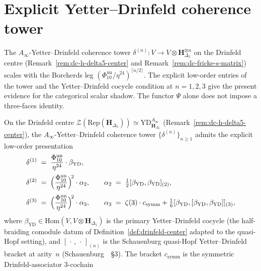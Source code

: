 \section{Explicit Yetter--Drinfeld coherence tower}
\label{sec:dc-yd-tower}

The $A_\infty$-Yetter--Drinfeld coherence tower
$\delta^{(n)}\colon V \to V\otimes \mathbf{H}_{\Delta_5}^{\otimes n}$
on the Drinfeld centre (Remark~\ref{rem:dc-h-delta5-center}
and Remark~\ref{rem:dc-fricke-s-matrix}) scales with the
Borcherds leg $(\Phi_{10}^{\mathrm{un}}/\eta^{24})^{\lceil n/2\rceil}$. The explicit
low-order entries of the tower and the Yetter--Drinfeld cocycle
condition at \(n=1,2,3\) give the present evidence for the categorical
scalar shadow. The functor \(\Psi\) alone does not impose a
three-faces identity.

\begin{proposition}
\label{prop:dc-yd-tower}
On the Drinfeld centre
$\mathcal{Z}(\mathrm{Rep}(\mathbf{H}_{\Delta_5})) \simeq
\mathrm{YD}^{A_\infty}_{\mathbf{H}_{\Delta_5}}$
(Remark~\ref{rem:dc-h-delta5-center}), the
$A_\infty$-Yetter--Drinfeld coherence tower
$\{\delta^{(n)}\}_{n\geq 1}$ admits the explicit low-order
presentation
\begin{align}
 \delta^{(1)} &\;=\; \frac{\Phi_{10}^{\mathrm{un}}}{\eta^{24}}\cdot\beta_{\mathrm{YD}},
 \label{eq:dc-delta-1}\\[2pt]
 \delta^{(2)} &\;=\; \Bigl(\frac{\Phi_{10}^{\mathrm{un}}}{\eta^{24}}\Bigr)^{\!2}
 \cdot \alpha_2,
 \qquad
 \alpha_2 \;=\; \tfrac{1}{2}[\beta_{\mathrm{YD}}, \beta_{\mathrm{YD}}]_{(2)},
 \label{eq:dc-delta-2}\\[2pt]
 \delta^{(3)} &\;=\; \Bigl(\frac{\Phi_{10}^{\mathrm{un}}}{\eta^{24}}\Bigr)^{\!2}
 \cdot \alpha_3,
 \qquad
 \alpha_3 \;=\; \zeta(3)\cdot c_{\mathrm{symm}}
 + \tfrac{1}{6}[\beta_{\mathrm{YD}},[\beta_{\mathrm{YD}},\beta_{\mathrm{YD}}]]_{(3)},
 \label{eq:dc-delta-3}
\end{align}
where $\beta_{\mathrm{YD}}\in\mathrm{Hom}(V, V\otimes\mathbf{H}_{\Delta_5})$
is the primary Yetter--Drinfeld cocycle (the half-braiding
comodule datum of Definition~\ref{def:drinfeld-center} adapted to
the quasi-Hopf setting), and $[\,\cdot\,,\,\cdot\,]_{(n)}$ is the
Schauenburg quasi-Hopf Yetter--Drinfeld bracket at arity~$n$
(Schauenburg~\cite{Schauenburg1998DoubleQHopf}~\S3). The bracket
$c_{\mathrm{symm}}$ is the symmetric Drinfeld-associator $3$-cochain

\end{proposition}
